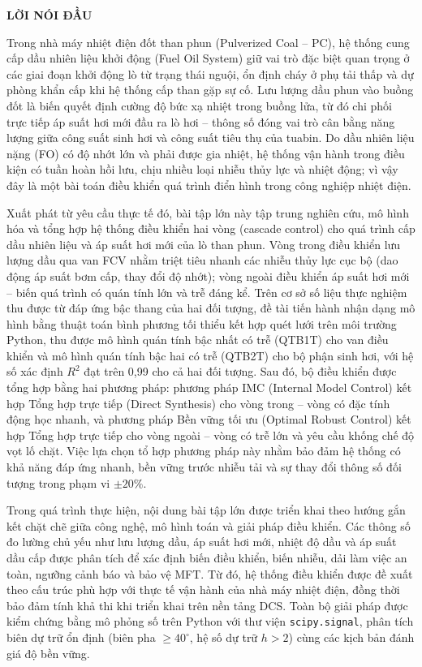 \documentclass[../main.tex]{subfiles}
\begin{document}
\begin{center}
    \Large{\textbf{LỜI NÓI ĐẦU}}\\
\end{center}
\vspace{1cm}

Trong nhà máy nhiệt điện đốt than phun (Pulverized Coal -- PC), hệ thống cung cấp dầu nhiên liệu khởi động (Fuel Oil System) giữ vai trò đặc biệt quan trọng ở các giai đoạn khởi động lò từ trạng thái nguội, ổn định cháy ở phụ tải thấp và dự phòng khẩn cấp khi hệ thống cấp than gặp sự cố. Lưu lượng dầu phun vào buồng đốt là biến quyết định cường độ bức xạ nhiệt trong buồng lửa, từ đó chi phối trực tiếp áp suất hơi mới đầu ra lò hơi -- thông số đóng vai trò cân bằng năng lượng giữa công suất sinh hơi và công suất tiêu thụ của tuabin. Do dầu nhiên liệu nặng (FO) có độ nhớt lớn và phải được gia nhiệt, hệ thống vận hành trong điều kiện có tuần hoàn hồi lưu, chịu nhiều loại nhiễu thủy lực và nhiệt động; vì vậy đây là một bài toán điều khiển quá trình điển hình trong công nghiệp nhiệt điện.

Xuất phát từ yêu cầu thực tế đó, bài tập lớn này tập trung nghiên cứu, mô hình hóa và tổng hợp hệ thống điều khiển hai vòng (cascade control) cho quá trình cấp dầu nhiên liệu và áp suất hơi mới của lò than phun. Vòng trong điều khiển lưu lượng dầu qua van FCV nhằm triệt tiêu nhanh các nhiễu thủy lực cục bộ (dao động áp suất bơm cấp, thay đổi độ nhớt); vòng ngoài điều khiển áp suất hơi mới -- biến quá trình có quán tính lớn và trễ đáng kể. Trên cơ sở số liệu thực nghiệm thu được từ đáp ứng bậc thang của hai đối tượng, đề tài tiến hành nhận dạng mô hình bằng thuật toán bình phương tối thiểu kết hợp quét lưới trên môi trường Python, thu được mô hình quán tính bậc nhất có trễ (QTB1T) cho van điều khiển và mô hình quán tính bậc hai có trễ (QTB2T) cho bộ phận sinh hơi, với hệ số xác định $R^2$ đạt trên 0{,}99 cho cả hai đối tượng. Sau đó, bộ điều khiển được tổng hợp bằng hai phương pháp: phương pháp IMC (Internal Model Control) kết hợp Tổng hợp trực tiếp (Direct Synthesis) cho vòng trong -- vòng có đặc tính động học nhanh, và phương pháp Bền vững tối ưu (Optimal Robust Control) kết hợp Tổng hợp trực tiếp cho vòng ngoài -- vòng có trễ lớn và yêu cầu khống chế độ vọt lố chặt. Việc lựa chọn tổ hợp phương pháp này nhằm bảo đảm hệ thống có khả năng đáp ứng nhanh, bền vững trước nhiễu tải và sự thay đổi thông số đối tượng trong phạm vi $\pm 20\%$.

Trong quá trình thực hiện, nội dung bài tập lớn được triển khai theo hướng gắn kết chặt chẽ giữa công nghệ, mô hình toán và giải pháp điều khiển. Các thông số đo lường chủ yếu như lưu lượng dầu, áp suất hơi mới, nhiệt độ dầu và áp suất dầu cấp được phân tích để xác định biến điều khiển, biến nhiễu, dải làm việc an toàn, ngưỡng cảnh báo và bảo vệ MFT. Từ đó, hệ thống điều khiển được đề xuất theo cấu trúc phù hợp với thực tế vận hành của nhà máy nhiệt điện, đồng thời bảo đảm tính khả thi khi triển khai trên nền tảng DCS. Toàn bộ giải pháp được kiểm chứng bằng mô phỏng số trên Python với thư viện \texttt{scipy.signal}, phân tích biên dự trữ ổn định (biên pha $\geq 40^\circ$, hệ số dự trữ $h > 2$) cùng các kịch bản đánh giá độ bền vững.
\end{document}
